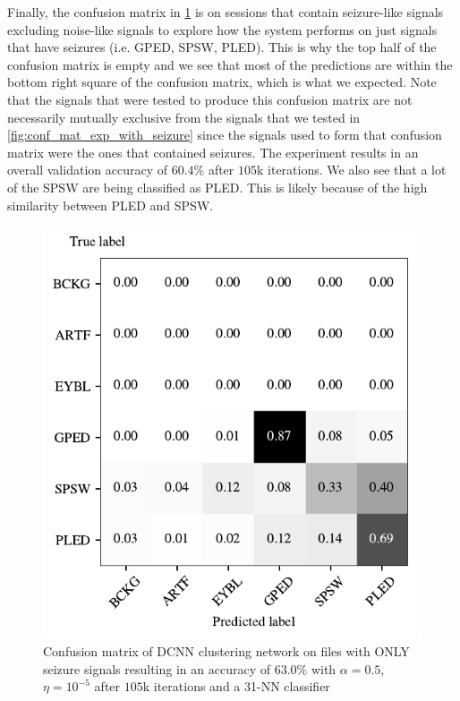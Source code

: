 Finally, the confusion matrix in \cref{fig:conf_mat_exp_with_only_seizure} is on sessions that contain seizure-like signals excluding noise-like signals to explore how the system performs on just signals that have seizures (i.e. GPED, SPSW, PLED). This is why the top half of the confusion matrix is empty and we see that most of the predictions are within the bottom right square of the confusion matrix, which is what we expected. Note that the signals that were tested to produce this confusion matrix are not necessarily mutually exclusive from the signals that we tested in \cref{fig:conf_mat_exp_with_seizure} since the signals used to form that confusion matrix were the ones that contained seizures. The experiment results in an overall validation accuracy of $60.4\%$ after $105$k iterations. We also see that a lot of the SPSW are being classified as PLED. This is likely because of the high similarity between PLED and SPSW.

\begin{figure}[!ht]
	\centering
	\includegraphics[width=0.7\linewidth]{pictures/conf_mat_exp_with_only_seizure.pdf}
	\caption[Confusion matrix on sessions with only seizure-like signals]{Confusion matrix of DCNN clustering network on files with ONLY seizure signals resulting in an accuracy of $63.0\%$ with $\alpha = 0.5$, $\eta = 10^{-5}$ after $105$k iterations and a 31-NN classifier}\label{fig:conf_mat_exp_with_only_seizure}  
\end{figure}

